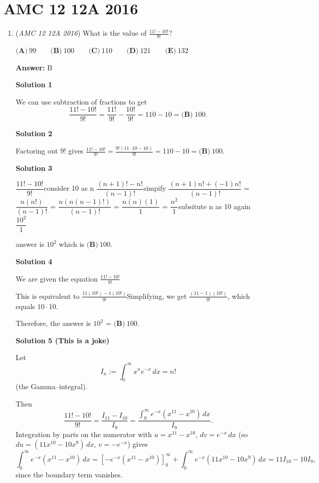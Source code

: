 \section{AMC 12 12A 2016}
        \begin{enumerate}
        	\item (\textit{AMC 12 12A 2016}) What is the value of $\frac{11!-10!}{9!}$?


 $\textbf{(A)}\ 99\qquad\textbf{(B)}\ 100\qquad\textbf{(C)}\ 110\qquad\textbf{(D)}\ 121\qquad\textbf{(E)}\ 132$

 \textbf{Answer: }B



\textbf{Solution 1}

We can use subtraction of fractions to get 
 \[\frac{11!-10!}{9!} = \frac{11!}{9!} - \frac{10!}{9!} = 110 -10 = \boxed{\textbf{(B)}\;100}.\]




\textbf{Solution 2}

Factoring out $9!$ gives $\frac{11!-10!}{9!} = \frac{9!(11 \cdot 10 - 10)}{9!} = 110-10=\boxed{\textbf{(B)}~100}$.

 


 



\textbf{Solution 3}

$\dfrac{11!-10!}{9!}$consider 10 as n $\dfrac{(n+1)!-n!}{(n-1)!}$simpify $\dfrac{(n+1)n!+(-1)n!}{(n-1)!}$ = $\dfrac{n(n!)}{(n-1)!}$ = $\dfrac{n(n(n-1)!)}{(n-1)!}$ = $\dfrac{n(n)(1)}{1}$ = $\dfrac{n^2}{1}$subsitute n as 10 again  $\dfrac{10^2}{1}$

 answer is $10^2$ which is $\boxed{\textbf{(B)}~100}$.

 



\textbf{Solution 4}

We are given the equation $\frac{11!-10!}{9!}$

 This is equivalent to $\frac{11(10!) - 1(10!)}{9!}$Simplifying, we get $\frac{(11-1)(10!)}{9!}$, which equals $10 \cdot 10$.

 Therefore, the answer is $10^2$ = $\boxed{\textbf{(B)}~100}$.

 



\textbf{Solution 5 (This is a joke)}

Let
 \[I_n := \int_0^\infty x^n e^{-x} \, dx = n!\](the Gamma–integral).

 Then
 \[\frac{11! - 10!}{9!} = \frac{I_{11} - I_{10}}{I_9} = \frac{\int_0^\infty e^{-x} (x^{11} - x^{10}) \, dx}{I_9}.\]Integration by parts on the numerator with \( u = x^{11} - x^{10} \), \( dv = e^{-x} \, dx \) (so \( du = (11x^{10} - 10x^9) \, dx \), \( v = -e^{-x} \)) gives
 \[\int_0^\infty e^{-x} (x^{11} - x^{10}) \, dx = \left[ -e^{-x} (x^{11} - x^{10}) \right]_0^\infty + \int_0^\infty e^{-x} (11x^{10} - 10x^9) \, dx = 11 I_{10} - 10 I_9,\]since the boundary term vanishes.


\end{enumerate}
